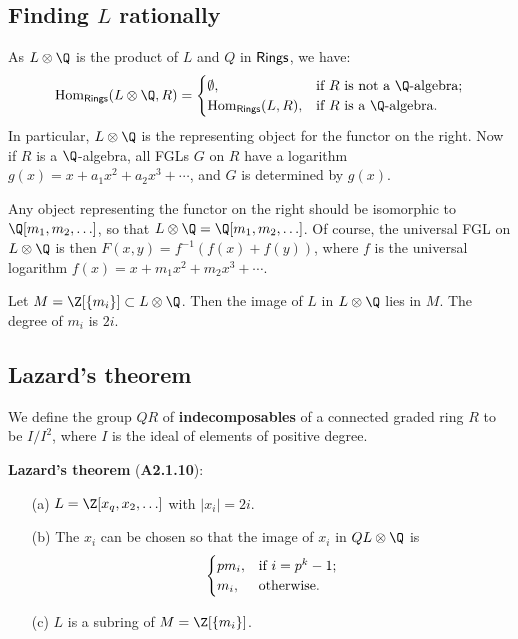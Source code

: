 \documentclass[11pt]{article}
\begin{document}
\begin{Formal Group Laws}
\subsection*{Finding $L$ rationally}

\begin{itemise}
\item
As $L\otimes\Q$ is the product of $L$ and $Q$ in $\operatorname{{\mathsf{Rings}}}$, we have:
\[\Hom_{\Rings}(L\otimes\Q,R)=\begin{cases}
\emptyset,&\textup{if $R$ is not a $\Q$-algebra};\\
\Hom_{\Rings}(L,R),&\textup{if $R$ is a $\Q$-algebra}.
\end{cases}\]
In particular, $L\otimes\Q$ is the representing object for the functor on the right. Now if $R$ is a $\Q$-algebra, all FGLs $G$ on $R$ have a logarithm $g(x)=x+a_1x^2+a_2x^3+\cdots$, and $G$ is determined by $g(x)$.

\INDENT Any object representing the functor on the right should be isomorphic to $\Q[m_1,m_2,\ldots]$, so that $L\otimes\Q=\Q[m_1,m_2,\ldots]$. Of course, the universal FGL on $L\otimes\Q$ is then $F(x,y)=f^{-1}(f(x)+f(y))$, where $f$ is the universal logarithm $f(x)=x+m_1x^2+m_2x^3+\cdots$.

\INDENT Let $M=\Z[\{m_i\}]\subset L\otimes\Q$. Then the image of $L$ in $L\otimes\Q$ lies in $M$. The degree of $m_i$ is $2i$.
\end{itemise}
\subsection*{Lazard's theorem}
\begin{itemise}
\item We define the group $QR$ of \textbf{indecomposables} of a connected graded ring $R$ to be $I/I^2$, where $I$ is the ideal of elements of positive degree.
\item \textbf{Lazard's theorem} (\textbf{A2.1.10}):
\begin{enumerate}\squishlist
\item[(a)] $L=\Z[x_q,x_2,\ldots]$ with $|x_i|=2i$.
\item[(b)] The $x_i$ can be chosen so that the image of $x_i$ in $QL\otimes\Q$ is
\[\begin{cases}
pm_i,&\textup{if }i=p^k-1;\\
m_i,&\textup{otherwise}.
\end{cases}
\]
\item[(c)] $L$ is a subring of $M=\Z[\{m_i\}]$.
\end{enumerate}
\end{itemise}

\end{Formal Group Laws}
\end{document}
